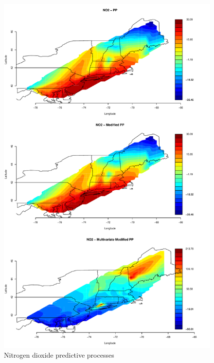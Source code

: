 \documentclass[12pt]{article}
\begin{document}
\begin{figure}[ht]
\begin{center}
\includegraphics[scale=0.5]{figs/no2_pp.pdf}
\end{center}
\caption{Nitrogen dioxide predictive processes}
\end{figure}
\end{document}
